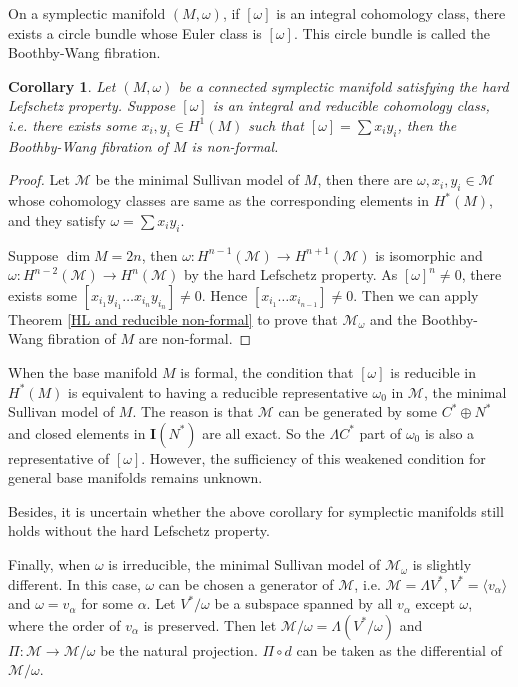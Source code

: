\documentclass{article}
\theoremstyle{plain}
\newtheorem{cor}[thm]{Corollary}
\theoremstyle{definition}
\theoremstyle{plain}
\numberwithin{equation}{section}
\begin{document}
On a symplectic manifold $(M,\omega)$, if $[\omega]$ is an integral cohomology class, there exists a circle bundle whose Euler class is $[\omega]$. This circle bundle is called the Boothby-Wang fibration.

\begin{cor}
Let $(M,\omega)$ be a connected symplectic manifold satisfying the hard Lefschetz property. Suppose $[\omega]$ is an integral and reducible cohomology class, i.e. there exists some $x_i,y_i\in H^1(M)$ such that $[\omega]=\sum x_i y_i$, then the Boothby-Wang fibration of $M$ is non-formal.
\end{cor}
\begin{proof}
Let $\mathcal{M}$ be the minimal Sullivan model of $M$, then there are $\omega,x_i,y_i\in\mathcal{M}$ whose cohomology classes are same as the corresponding elements in $H^*(M)$, and they satisfy $\omega=\sum x_i y_i$.

Suppose $\dim M=2n$, then $\omega:H^{n-1}(\mathcal{M})\to H^{n+1}(\mathcal{M})$ is isomorphic and $\omega:H^{n-2}(\mathcal{M})\to H^n(\mathcal{M})$ by the hard Lefschetz property. As $[\omega]^n\neq 0$, there exists some $[x_{i_1}y_{i_1}\ldots x_{i_n}y_{i_n}]\neq 0$. Hence $[x_{i_1}\ldots x_{i_{n-1}}]\neq 0.$ Then we can apply Theorem \ref{HL and reducible non-formal} to prove that $\mathcal{M}_{\omega}$ and the Boothby-Wang fibration of $M$ are non-formal.
\end{proof}

When the base manifold $M$ is formal, the condition that $[\omega]$ is reducible in $H^*(M)$ is equivalent to having a reducible representative $\omega_0$ in $\mathcal{M}$, the minimal Sullivan model of $M$. The reason is that $\mathcal{M}$ can be generated by some $C^*\oplus N^*$ and closed elements in $\mathbf{I}(N^*)$ are all exact. So the $\Lambda C^*$ part of $\omega_0$ is also a representative of $[\omega]$. However, the sufficiency of this weakened condition for general base manifolds remains unknown.

Besides, it is uncertain whether the above corollary for symplectic manifolds still holds without the hard Lefschetz property.

Finally, when $\omega$ is irreducible, the minimal Sullivan model of $\mathcal{M}_{\omega}$ is slightly different. In this case, $\omega$ can be chosen a generator of $\mathcal{M}$, i.e. $\mathcal{M}=\Lambda V^*, V^*=\langle v_{\alpha} \rangle$ and $\omega=v_\alpha$ for some $\alpha$. Let $V^*/\omega$ be a subspace spanned by all $v_{\alpha}$ except $\omega$, where the order of $v_{\alpha}$ is preserved. Then let $\mathcal{M}/\omega=\Lambda(V^*/\omega)$ and $\Pi:\mathcal{M}\to\mathcal{M}/\omega$ be the natural projection. $\Pi\circ d$ can be taken as the differential of $\mathcal{M}/\omega$.
\end{document}
